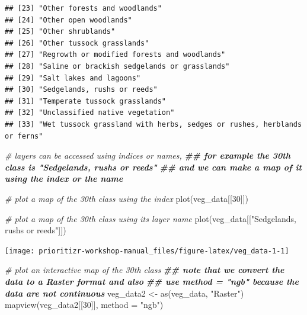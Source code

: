 \documentclass[
  12pt,
]{book}
\newenvironment{Shaded}{\begin{snugshade}}{\end{snugshade}}
\newcommand{\AttributeTok}[1]{\textcolor[rgb]{0.77,0.63,0.00}{#1}}
\newcommand{\CommentTok}[1]{\textcolor[rgb]{0.56,0.35,0.01}{\textit{#1}}}
\newcommand{\DecValTok}[1]{\textcolor[rgb]{0.00,0.00,0.81}{#1}}
\newcommand{\DocumentationTok}[1]{\textcolor[rgb]{0.56,0.35,0.01}{\textbf{\textit{#1}}}}
\newcommand{\FunctionTok}[1]{\textcolor[rgb]{0.00,0.00,0.00}{#1}}
\newcommand{\NormalTok}[1]{#1}
\newcommand{\OtherTok}[1]{\textcolor[rgb]{0.56,0.35,0.01}{#1}}
\newcommand{\StringTok}[1]{\textcolor[rgb]{0.31,0.60,0.02}{#1}}
\begin{document}
\begin{verbatim}
## [23] "Other forests and woodlands"                                                                               
## [24] "Other open woodlands"                                                                                      
## [25] "Other shrublands"                                                                                          
## [26] "Other tussock grasslands"                                                                                  
## [27] "Regrowth or modified forests and woodlands"                                                                
## [28] "Saline or brackish sedgelands or grasslands"                                                               
## [29] "Salt lakes and lagoons"                                                                                    
## [30] "Sedgelands, rushs or reeds"                                                                                
## [31] "Temperate tussock grasslands"                                                                              
## [32] "Unclassified native vegetation"                                                                            
## [33] "Wet tussock grassland with herbs, sedges or rushes, herblands or ferns"
\end{verbatim}

\begin{Shaded}
\begin{Highlighting}[]
\CommentTok{\# layers can be accessed using indices or names,}
\DocumentationTok{\#\# for example the 30th class is "Sedgelands, rushs or reeds"}
\DocumentationTok{\#\# and we can make a map of it using the index or the name}

\CommentTok{\# plot a map of the 30th class using the index}
\FunctionTok{plot}\NormalTok{(veg\_data[[}\DecValTok{30}\NormalTok{]])}

\CommentTok{\# plot a map of the 30th class using its layer name}
\FunctionTok{plot}\NormalTok{(veg\_data[[}\StringTok{"Sedgelands, rushs or reeds"}\NormalTok{]])}
\end{Highlighting}
\end{Shaded}

\begin{center}\texttt{[image: prioritizr-workshop-manual\_files/figure-latex/veg\_data-1-1]} \end{center}

\begin{Shaded}
\begin{Highlighting}[]
\CommentTok{\# plot an interactive map of the 30th class}
\DocumentationTok{\#\# note that we convert the data to a Raster format and also}
\DocumentationTok{\#\# use method = "ngb" because the data are not continuous}
\NormalTok{veg\_data2 }\OtherTok{\textless{}{-}} \FunctionTok{as}\NormalTok{(veg\_data, }\StringTok{"Raster"}\NormalTok{)}
\FunctionTok{mapview}\NormalTok{(veg\_data2[[}\DecValTok{30}\NormalTok{]], }\AttributeTok{method =} \StringTok{"ngb"}\NormalTok{)}
\end{Highlighting}
\end{Shaded}
\end{document}
